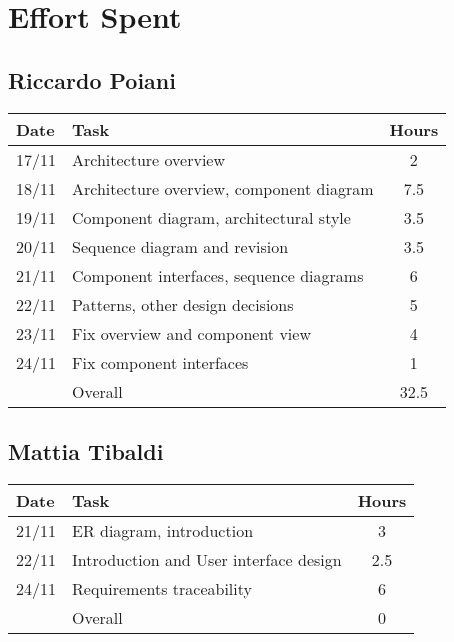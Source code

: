 \section{Effort Spent}

\subsection{Riccardo Poiani}

\begin{table}[H]
\begin{tabularx}{\textwidth}{|l|X|c|}
\hline
\rowcolor[HTML]{C0C0C0} 
Date & Task & Hours\\ \hline
17/11 & Architecture overview & 2\\ \hline
18/11 & Architecture overview, component diagram & 7.5 \\ \hline
19/11 & Component diagram, architectural style & 3.5\\ \hline
20/11 & Sequence diagram and revision & 3.5\\ \hline
21/11 & Component interfaces, sequence diagrams & 6\\ \hline
22/11 & Patterns, other design decisions & 5 \\ \hline
23/11 & Fix overview and component view & 4  \\  \hline
24/11 & Fix component interfaces & 1 \\ \hline
\rowcolor[HTML]{C0C0C0} 
& Overall & 32.5 \\ \hline
\end{tabularx}
\end{table}

\subsection{Mattia Tibaldi}

\begin{table}[H]
\begin{tabularx}{\textwidth}{|l|X|c|}
\hline
\rowcolor[HTML]{C0C0C0} 
Date & Task & Hours\\ \hline
21/11 & ER diagram, introduction & 3 \\ \hline
22/11 & Introduction and User interface design & 2.5 \\ \hline
24/11 & Requirements traceability & 6 \\ \hline 
\rowcolor[HTML]{C0C0C0} 
& Overall & 0\\ \hline
\end{tabularx}
\end{table}

